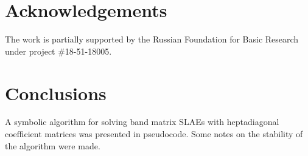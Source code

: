 \documentclass[11pt, a4paper]{article}
\begin{document}

\section*{Acknowledgements}
The work is partially supported by the Russian Foundation 
for Basic Research under project \#18-51-18005.


\section{Conclusions}

A symbolic algorithm for solving band matrix SLAEs with heptadiagonal
coefficient matrices was presented in pseudocode. Some notes on the stability
of the algorithm were made.
\end{document}

